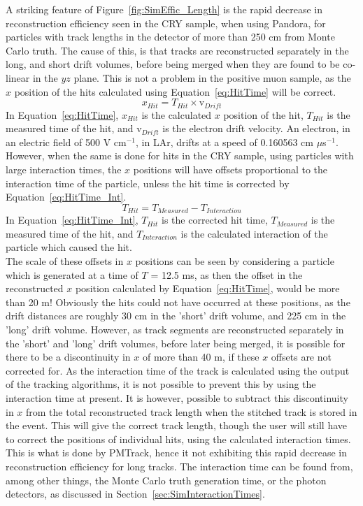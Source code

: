 A striking feature of Figure~\ref{fig:SimEffic_Length} is the rapid decrease in reconstruction efficiency seen in the CRY sample, when using Pandora, for particles with track lengths in the detector of more than 250 cm from Monte Carlo truth. The cause of this, is that tracks are reconstructed separately in the long, and short drift volumes, before being merged when they are found to be co-linear in the $yz$ plane. This is not a problem in the positive muon sample, as the $x$ position of the hits calculated using Equation~\ref{eq:HitTime} will be correct.
\begin{equation}
   \label{eq:HitTime}
   x_{Hit} = T_{Hit} \times \text{v}_{Drift}
\end{equation}
In Equation~\ref{eq:HitTime}, $x_{Hit}$ is the calculated $x$ position of the hit, $T_{Hit}$ is the measured time of the hit, and v$_{Drift}$ is the electron drift velocity. An electron, in an electric field of 500 V cm$^{-1}$, in LAr, drifts at a speed of 0.160563 cm $\mu$s$^{-1}$. However, when the same is done for hits in the CRY sample, using particles with large interaction times, the $x$ positions will have offsets proportional to the interaction time of the particle, unless the hit time is corrected by Equation~\ref{eq:HitTime_Int}.
\begin{equation}
   \label{eq:HitTime_Int}
   T_{Hit} = T_{Measured} - T_{Interaction}
\end{equation}
In Equation~\ref{eq:HitTime_Int}, $T_{Hit}$ is the corrected hit time, $T_{Measured}$ is the measured time of the hit, and $T_{Interaction}$ is the calculated interaction of the particle which caused the hit. \\

The scale of these offsets in $x$ positions can be seen by considering a particle which is generated at a time of $T$ = 12.5 ms, as then the offset in the reconstructed $x$ position calculated by Equation~\ref{eq:HitTime}, would be more than 20 m! Obviously the hits could not have occurred at these positions, as the drift distances are roughly 30 cm in the 'short' drift volume, and 225 cm in the 'long' drift volume. However, as track segments are reconstructed separately in the 'short' and 'long' drift volumes, before later being merged, it is possible for there to be a discontinuity in $x$ of more than 40 m, if these $x$ offsets are not corrected for. As the interaction time of the track is calculated using the output of the tracking algorithms, it is not possible to prevent this by using the interaction time at present. It is however, possible to subtract this discontinuity in $x$ from the total reconstructed track length when the stitched track is stored in the event. This will give the correct track length, though the user will still have to correct the positions of individual hits, using the calculated interaction times. This is what is done by PMTrack, hence it not exhibiting this rapid decrease in reconstruction efficiency for long tracks. The interaction time can be found from, among other things, the Monte Carlo truth generation time, or the photon detectors, as discussed in Section~\ref{sec:SimInteractionTimes}.\\

